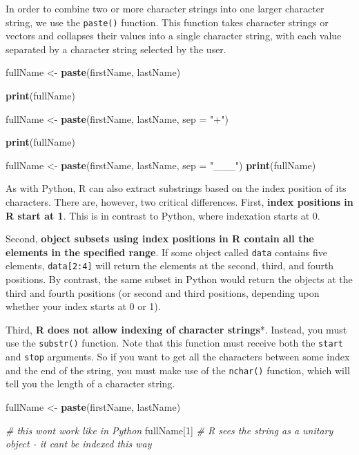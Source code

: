 \documentclass[
]{book}
\newenvironment{Shaded}{\begin{snugshade}}{\end{snugshade}}
\newcommand{\CommentTok}[1]{\textcolor[rgb]{0.56,0.35,0.01}{\textit{#1}}}
\newcommand{\DataTypeTok}[1]{\textcolor[rgb]{0.13,0.29,0.53}{#1}}
\newcommand{\DecValTok}[1]{\textcolor[rgb]{0.00,0.00,0.81}{#1}}
\newcommand{\KeywordTok}[1]{\textcolor[rgb]{0.13,0.29,0.53}{\textbf{#1}}}
\newcommand{\NormalTok}[1]{#1}
\newcommand{\StringTok}[1]{\textcolor[rgb]{0.31,0.60,0.02}{#1}}
\begin{document}
In order to combine two or more character strings into one larger character string, we use the \texttt{paste()} function. This function takes character strings or vectors and collapses their values into a single character string, with each value separated by a character string selected by the user.

\begin{Shaded}
\begin{Highlighting}[]
\NormalTok{fullName \textless{}{-}}\StringTok{ }\KeywordTok{paste}\NormalTok{(firstName, lastName)}

\KeywordTok{print}\NormalTok{(fullName)}

\NormalTok{fullName \textless{}{-}}\StringTok{ }\KeywordTok{paste}\NormalTok{(firstName, lastName, }\DataTypeTok{sep =} \StringTok{"+"}\NormalTok{)}

\KeywordTok{print}\NormalTok{(fullName)}

\NormalTok{fullName \textless{}{-}}\StringTok{ }\KeywordTok{paste}\NormalTok{(firstName, lastName, }\DataTypeTok{sep =} \StringTok{"\_\_\_"}\NormalTok{)}
\KeywordTok{print}\NormalTok{(fullName)}
\end{Highlighting}
\end{Shaded}

As with Python, R can also extract substrings based on the index position of its characters. There are, however, two critical differences. First, \textbf{index positions in R start at 1}. This is in contrast to Python, where indexation starts at 0.

Second, \textbf{object subsets using index positions in R contain all the elements in the specified range}. If some object called \texttt{data} contains five elements, \texttt{data{[}2:4{]}} will return the elements at the second, third, and fourth positions. By contrast, the same subset in Python would return the objects at the third and fourth positions (or second and third positions, depending upon whether your index starts at 0 or 1).

Third, \textbf{R does not allow indexing of character strings}*. Instead, you must use the \texttt{substr()} function. Note that this function must receive both the \texttt{start} and \texttt{stop} arguments. So if you want to get all the characters between some index and the end of the string, you must make use of the \texttt{nchar()} function, which will tell you the length of a character string.

\begin{Shaded}
\begin{Highlighting}[]
\NormalTok{fullName \textless{}{-}}\StringTok{ }\KeywordTok{paste}\NormalTok{(firstName, lastName)}

\CommentTok{\# this won\textquotesingle{}t work like in Python}
\NormalTok{fullName[}\DecValTok{1}\NormalTok{] }\CommentTok{\# R sees the string as a unitary object {-} it can\textquotesingle{}t be indexed this way}
\end{Highlighting}
\end{Shaded}
\end{document}
